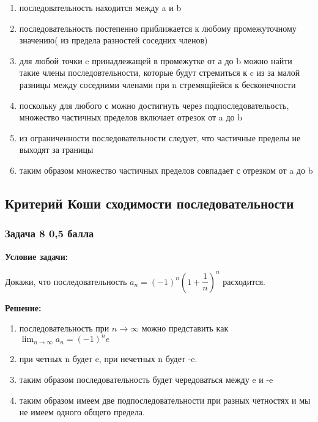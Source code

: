 \documentclass[a4paper,12pt]{article}
\begin{document}
\begin{enumerate}
    \item последовательность находится между a и b 
    \item последовательность постепенно приближается к любому промежуточному значению( из предела разностей соседних членов)
    \item для любой точки c принадлежащей в промежутке от а до b можно найти такие члены последовтельности, которые будут стремиться к c из за малой разницы между соседними членами при n стремящйейся к бесконечности
    \item поскольку для любого  с можно достигнуть через подпоследовательость, множество частичных пределов включает отрезок от a до b
    \item из ограниченности последовательности следует, что частичные пределы не выходят за границы
    \item таким образом множество частичных пределов совпадает с отрезком от a до b
\end{enumerate}
\vspace{1cm}

\subsection{Критерий Коши сходимости последовательности}

\subsubsection{Задача 8 \hfill 0,5 балла}

\textbf{Условие задачи:}

Докажи, что последовательность \( a_n = (-1)^n \left( 1 + \dfrac{1}{n} \right)^n \) расходится.

\textbf{Решение: }

\begin{enumerate}
    \item последовательность при $n \to \infty $ можно представить как $\lim_{n \to \infty}  a_n = (-1)^n e$
    \item при четных n будет e, при нечетных n будет -e. 
    \item таким образом последовательность будет чередоваться между e и -e 
    \item таким образом имеем две подпоследовательности при разных четностях и мы не имеем одного общего предела.
\end{enumerate}
\vspace{1cm}
\end{document}
